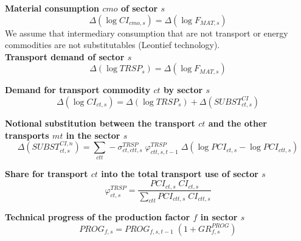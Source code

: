 \documentclass[12pt]{article}
\numberwithin{equation}{section}
\begin{document}
\noindent \textbf{Material consumption $cmo$ of sector $s$} 
\begin{dmath}
\varDelta \left(\operatorname{log} CI_{cmo, s}\right) = \varDelta \left(\operatorname{log} F_{MAT, s}\right)
\label{producer.mdlCI[cmo, s]}
\end{dmath}
We assume that intermediary consumption that are not transport or energy commodities are not substitutables (Leontief technology).  \\

\noindent \textbf{Transport demand of sector $s$} 
\begin{dmath}
\varDelta \left(\operatorname{log} TRSP_{s}\right) = \varDelta \left(\operatorname{log} F_{MAT, s}\right)
\label{producer.mdlTRSP[s]}
\end{dmath}


\noindent \textbf{Demand for transport commodity $ct$ by sector $s$} 
\begin{dmath}
\varDelta \left(\operatorname{log} CI_{ct, s}\right) = \varDelta \left(\operatorname{log} TRSP_{s}\right) + \varDelta \left(SUBST^{CI}_{ct, s}\right)
\label{producer.mdlCI[ct, s]}
\end{dmath}

\noindent \textbf{Notional substitution between the transport $ct$ and the other transports $mt$ in the sector $s$} 
\begin{dmath}
\varDelta \left(SUBST^{CI,n}_{ct, s}\right) = \sum_{ctt} -\sigma^{TRSP}_{ct, ctt, s} \; \varphi^{TRSP}_{ctt, s, t-1} \; \varDelta \left(\operatorname{log} PCI_{ct, s} - \operatorname{log} PCI_{ctt, s}\right)
\label{producer.mdlSUBST_CI_n[ct, s]}
\end{dmath}

\noindent \textbf{Share for transport $ct$ into the total transport use of sector $s$} 
\begin{dmath}
\varphi^{TRSP}_{ct, s} = \frac{PCI_{ct, s} \; CI_{ct, s}}{\sum_{ctt} PCI_{ctt, s} \; CI_{ctt, s}}
\label{producer.mdlphi_TRSP[ct, s]}
\end{dmath}

\noindent \textbf{Technical progress of the production factor $f$ in sector $s$} 
\begin{dmath}
PROG_{f, s} = PROG_{f, s, t-1} \; \left( 1 + GR^{PROG}_{f, s} \right)
\label{producer.mdlPROG[f, s]}
\end{dmath}
\end{document}
